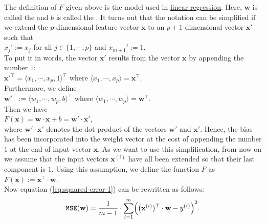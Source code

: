 The definition of $F$ given above is the model used in
\href{https://en.wikipedia.org/wiki/Linear_regression}{linear regression}. 
Here, $\mathbf{w}$ is called the  and $b$ is called the .  It turns
out that the notation can be simplified if we extend the $p$-dimensional feature vector $\mathbf{x}$ to an
$p+1$-dimensional vector $\mathbf{x}'$ such that
\\[0.2cm]
\hspace*{1.3cm}
$x_j' := x_j$ \quad for all $j\in\{1,\cdots,p\}$ \quad and \quad $x_{m+1}' := 1$.
\\[0.2cm]
To put it in words, the vector $\mathbf{x}'$ results from the vector $\mathbf{x}$ by appending the number $1$:
\\[0.2cm]
\hspace*{1.3cm}
$\mathbf{x}'^\top = \langle x_1, \cdots, x_p, 1 \rangle^\top$ \quad where $\langle x_1, \cdots, x_p \rangle = \mathbf{x}^\top$.
\\[0.2cm]
Furthermore, we define 
\\[0.2cm]
\hspace*{1.3cm}
$\mathbf{w}'^\top := \langle w_1, \cdots, w_p, b \rangle^\top$ \quad where $\langle w_1, \cdots, w_p \rangle = \mathbf{w}^\top$.
\\[0.2cm]
Then we have
\\[0.2cm]
\hspace*{1.3cm}
$F(\mathbf{x}) = \mathbf{w} \cdot \mathbf{x} + b = \mathbf{w}' \cdot \mathbf{x}'$,
\\[0.2cm]
where $\mathbf{w}' \cdot \mathbf{x}'$ denotes the dot product of the vectors $\mathbf{w}'$ and $\mathbf{x}'$.
Hence, the bias has been incorporated into the weight vector at the cost of appending the number $1$ at the end of
input vector $\mathbf{x}$.  As we want to use this simplification, from now on we assume that the input vectors
$\mathbf{x}^{(i)}$ have all been extended so that their last component is $1$.  Using this
assumption,  we define the
function $F$ as
\\[0.2cm]
\hspace*{1.3cm}
$F(\mathbf{x}) := \mathbf{x}^\top \cdot \mathbf{w}$.
\\[0.2cm]
Now equation (\ref{eq:squared-error-1}) can be rewritten as follows:
\begin{equation}
  \label{eq:squared-error-2}
  \mathtt{MSE}(\mathbf{w}) = \frac{1}{m-1} \cdot \sum\limits_{i=1}^m \Bigl(\bigl(\mathbf{x}^{(i)})^\top \cdot \mathbf{w}  - y^{(i)}\Bigr)^2.
\end{equation}
